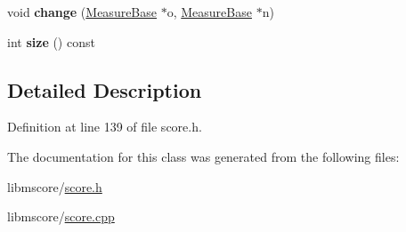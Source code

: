 \begin{DoxyCompactItemize}
\item 
\mbox{\label{class_ms_1_1_measure_base_list_a8a1d38bbd61a6613e9921f3412c39b51}} 
void {\bfseries change} (\hyperlink{class_ms_1_1_measure_base}{Measure\+Base} $\ast$o, \hyperlink{class_ms_1_1_measure_base}{Measure\+Base} $\ast$n)
\item 
\mbox{\label{class_ms_1_1_measure_base_list_a13bad6ab830ba9fdfd1f232172604836}} 
int {\bfseries size} () const
\end{DoxyCompactItemize}


\subsection{Detailed Description}


Definition at line 139 of file score.\+h.



The documentation for this class was generated from the following files\+:\begin{DoxyCompactItemize}
\item 
libmscore/\hyperlink{score_8h}{score.\+h}\item 
libmscore/\hyperlink{score_8cpp}{score.\+cpp}\end{DoxyCompactItemize}
